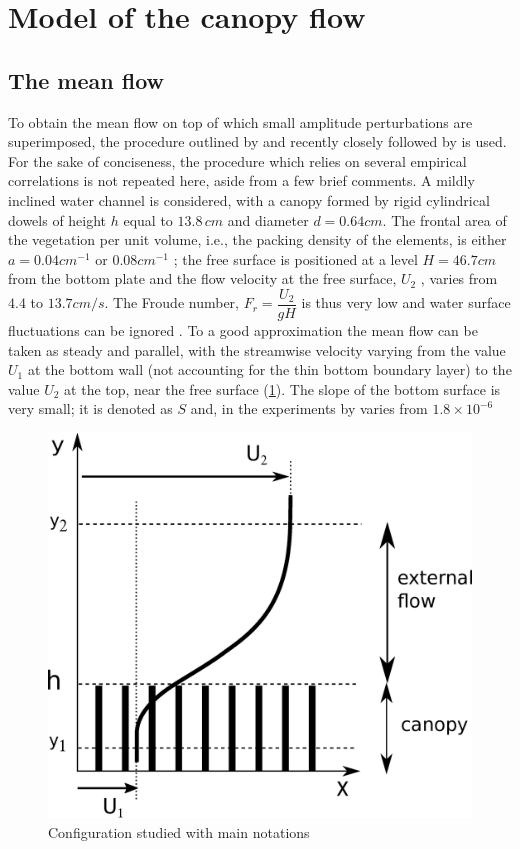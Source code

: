 \section{Model of the canopy flow}
\label{sec:2ch3}

\subsection{The mean flow}

To obtain the mean flow on top of which small amplitude perturbations are superimposed, the
procedure outlined by \cite{ghisalberti2004limited} and recently closely followed by \cite{zampogna2016instability} is
used. For the sake of conciseness, the procedure which relies on several empirical correlations is
not repeated here, aside from a few brief comments. A mildly inclined water channel is considered, with a canopy formed by rigid cylindrical dowels of height $h$ equal to $13.8 \, cm$ and diameter
$d = 0.64 cm$. The frontal area of the vegetation per unit volume, i.e., the packing density of the
elements, is either $a = 0.04 cm^{-1}$ or  $0.08 cm^{-1}$ ; the free surface is positioned at a level $H = 46.7 cm$
from the bottom plate and the flow velocity at the free surface, $U_2$ , varies from $4.4$ to $13.7 cm/s$. The
Froude number, $F_r = \dfrac{U_2}{g H} $ is thus very low and water surface fluctuations can be ignored \cite{brevis2014experimental}. 
To a good approximation the mean flow can be taken as steady and parallel, with the streamwise
velocity varying from the value $U_1$ at the bottom wall (not accounting for the thin bottom boundary
layer) to the value $U_2$ at the top, near the free surface (\ref{fig:1}). The slope of the bottom surface is
very small; it is denoted as $S$ and, in the experiments by \cite{ghisalberti2004limited} varies from $1.8 × 10^{-6}$

\begin{figure}[H]
	\centering
	\includegraphics[width=0.8\linewidth]{chapter_3/figure/1}
	\caption{Configuration studied with main notations}
	\label{fig:1}
\end{figure}


